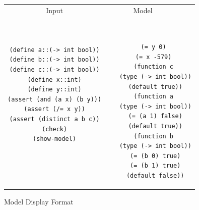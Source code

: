 \documentclass[11pt,twoside,fleqn,openright,titlepage]{cslreport}
\begin{document}
\begin{figure}
\begin{footnotesize}
\begin{center}
\begin{tabular}{c|c}
\multicolumn{1}{c}{Input} & \multicolumn{1}{c}{Model~~~~} \\[0.4em]

\begin{minipage}[c]{6cm}
\begin{verbatim}
(define a::(-> int bool))
(define b::(-> int bool))
(define c::(-> int bool))
(define x::int)
(define y::int)
(assert (and (a x) (b y)))
(assert (/= x y))
(assert (distinct a b c))
(check)
(show-model)
\end{verbatim}
\end{minipage}~~
&
~~~\begin{minipage}[c]{6cm}
\begin{verbatim}
  (= y 0)
  (= x -579)
  (function c
   (type (-> int bool))
   (default true))
  (function a
   (type (-> int bool))
   (= (a 1) false)
   (default true))
  (function b
   (type (-> int bool))
   (= (b 0) true)
   (= (b 1) true)
   (default false))
\end{verbatim}
\end{minipage}
\end{tabular}
\end{center}
\end{footnotesize}
\caption{Model Display Format}
\label{model-format}
\end{figure}

\end{document}
